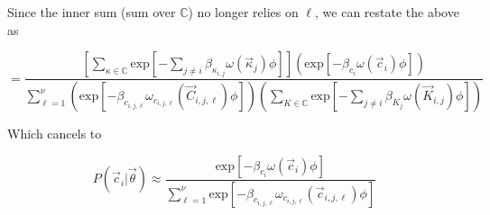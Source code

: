 \documentclass[11pt]{article} %
\begin{document}
Since the inner sum (sum over $\mathbb{C}$) no longer relies on $\ell$, we can restate the above as 

\[
=
\frac{
\left[
\sum _{\kappa \in \mathbb{C}}
\mbox{exp}\left[-\sum_{j\neq i} \beta_{\kappa_{i,j}} \omega (\vec{\kappa}_j) \phi \right]
\right]
\left(\mbox{exp}\left[-\beta_{c_i} \omega (\vec{c}_i) \phi \right]\right)
}{
\sum_{\ell=1}^\nu
\left(
\mbox{exp}\left[-\beta_{c_{i,j,\ell}} \omega_{c_{i,j,\ell}} (\vec{C}_{i,j,\ell}) \phi \right]
\right)\left(
\sum _{K \in \mathbb{C}}
\mbox{exp}\left[-\sum_{j\neq i} \beta_{K_j} \omega (\vec{K}_{i,j}) \phi \right]
\right)
}
\]


Which cancels to


\[
P(\vec{c}_i | \vec{\theta})
\approx
\frac{
\mbox{exp}\left[-\beta_{c_i} \omega (\vec{c}_i) \phi \right]
}{
\sum_{\ell=1}^\nu
\mbox{exp}\left[-\beta_{c_{i,j,\ell}} \omega_{c_{i,j,\ell}} (\vec{c}_{i,j,\ell}) \phi \right]
}
\]

%
\end{document}
